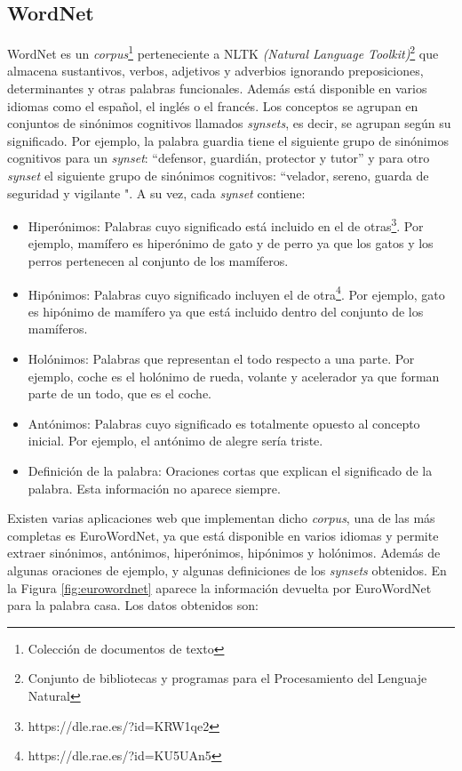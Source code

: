 \subsection{WordNet}
\label{cap:subsec:wordnet}
WordNet es un \textit{corpus}\footnote{Colección de documentos de texto} perteneciente a NLTK \textit{(Natural Language Toolkit)}\footnote{Conjunto de bibliotecas y programas para el Procesamiento del Lenguaje Natural} que almacena sustantivos, verbos, adjetivos y adverbios ignorando preposiciones, determinantes y otras palabras funcionales. Además está disponible en varios idiomas como el español, el inglés o el francés. Los conceptos se agrupan en conjuntos de sinónimos cognitivos llamados \textit{synsets}, es decir, se agrupan según su significado. Por ejemplo, la palabra guardia tiene el siguiente grupo de sinónimos cognitivos para un \textit{synset}: ``defensor, guardián, protector y tutor'' y para otro \textit{synset} el siguiente grupo de sinónimos cognitivos: ``velador, sereno, guarda de seguridad y vigilante ". A su vez, cada \textit{synset} contiene:
\begin{itemize}
	
	\item Hiperónimos: Palabras cuyo significado está incluido en el de otras\footnote{https://dle.rae.es/?id=KRW1qe2}. Por ejemplo, mamífero es hiperónimo de gato y de perro ya que los gatos y los perros pertenecen al conjunto de los mamíferos.
	\item Hipónimos: Palabras cuyo significado incluyen el de otra\footnote{https://dle.rae.es/?id=KU5UAn5}. Por ejemplo, gato es hipónimo de mamífero ya que está incluido dentro del conjunto de los mamíferos.
	\item Holónimos: Palabras que representan el todo respecto a una parte. Por ejemplo, coche es el holónimo de rueda, volante y acelerador ya que forman parte de un todo, que es el coche.
	\item Antónimos: Palabras cuyo significado es totalmente opuesto al concepto inicial. Por ejemplo, el antónimo de alegre sería triste.
	\item Definición de la palabra: Oraciones cortas que explican el significado de la palabra. Esta información no aparece siempre.
\end{itemize} 

Existen varias aplicaciones web que implementan dicho \textit{corpus}, una de las más completas es EuroWordNet, ya que está disponible en varios idiomas y permite extraer sinónimos, antónimos, hiperónimos, hipónimos y holónimos. Además de algunas oraciones de ejemplo, y algunas definiciones de los \textit{synsets} obtenidos. En la Figura \ref{fig:eurowordnet} aparece la información devuelta por EuroWordNet para la palabra casa. Los datos obtenidos son:


